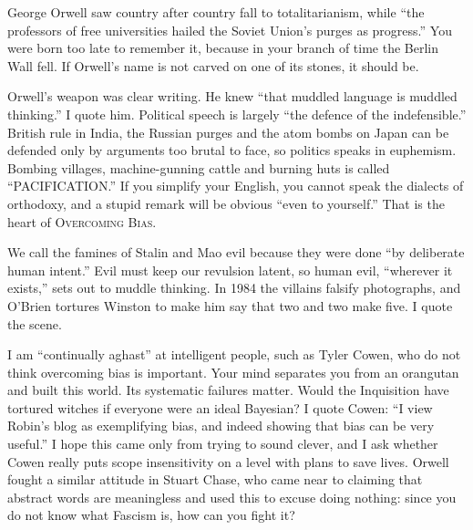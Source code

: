 
George Orwell saw country after country fall to totalitarianism, while ``the professors of free universities hailed the Soviet Union's purges as progress.'' You were born too late to remember it, because in your branch of time the Berlin Wall fell. If Orwell's name is not carved on one of its stones, it should be.

Orwell's weapon was clear writing. He knew ``that muddled language is muddled thinking.''  I quote him. Political speech is largely ``the defence of the indefensible.'' British rule in India, the Russian purges and the atom bombs on Japan can be defended only by arguments too brutal to face, so politics speaks in euphemism. Bombing villages, machine-gunning cattle and burning huts is called ``PACIFICATION.'' If you simplify your English, you cannot speak the dialects of orthodoxy, and a stupid remark will be obvious ``even to yourself.'' That is the heart of \textsc{Overcoming Bias}.

We call the famines of Stalin and Mao evil because they were done ``by deliberate human intent.''  Evil must keep our revulsion latent, so human evil, ``wherever it exists,'' sets out to muddle thinking.  In \textsc{1984} the villains falsify photographs, and O'Brien tortures Winston to make him say that two and two make five. I quote the scene.

I am ``continually aghast'' at intelligent people, such as Tyler Cowen, who do not think overcoming bias is important. Your mind separates you from an orangutan and built this world. Its systematic failures matter. Would the Inquisition have tortured witches if everyone were an ideal Bayesian?  I quote Cowen: ``I view Robin's blog as exemplifying bias, and indeed showing that bias can be very useful.''  I hope this came only from trying to sound clever, and I ask whether Cowen really puts scope insensitivity on a level with plans to save lives.  Orwell fought a similar attitude in Stuart Chase, who came near to claiming that abstract words are meaningless and used this to excuse doing nothing: since you do not know what Fascism is, how can you fight it?

